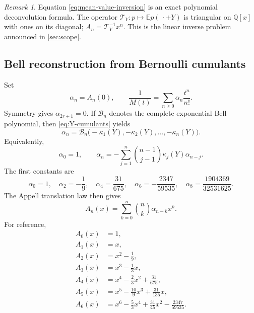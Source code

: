 \documentclass[11pt,oneside]{article}
\theoremstyle{frontier}
\theoremstyle{definition}
\theoremstyle{remark}
\newtheorem{remark}[theorem]{Remark}
\newcommand{\Q}{\mathbb Q}
\newcommand{\Bell}{\mathcal B}
\begin{document}
\begin{remark}
Equation \eqref{eq:mean-value-inversion} is an exact polynomial deconvolution formula.  The operator
$\mathcal T_Y:p\mapsto\mathbb E p(\,\cdot+Y)$ is triangular on $\Q[x]$ with ones on its diagonal;
$A_n=\mathcal T_Y^{-1}x^n$.  This is the linear inverse problem announced in
\cref{sec:scope}.
\end{remark}

\subsection{Bell reconstruction from Bernoulli cumulants}

Set
\begin{equation}
 \alpha_n=A_n(0),
 \qquad
 \frac1{M(t)}=\sum_{n\ge0}\alpha_n\frac{t^n}{n!}.
 \label{eq:alpha-def}
\end{equation}
Symmetry gives $\alpha_{2r+1}=0$.  If $\Bell_n$ denotes the complete exponential Bell polynomial,
then \eqref{eq:Y-cumulants} yields
\begin{equation}
 \boxed{
 \alpha_n=\Bell_n\bigl(-\kappa_1(Y),-\kappa_2(Y),\ldots,-\kappa_n(Y)\bigr).
 }
 \label{eq:alpha-Bell}
\end{equation}
Equivalently,
\begin{equation}
 \alpha_0=1,
 \qquad
 \alpha_n=-\sum_{j=1}^n\binom{n-1}{j-1}\kappa_j(Y)\alpha_{n-j}.
 \label{eq:alpha-recurrence}
\end{equation}
The first constants are
\begin{equation}
 \alpha_0=1,
 \quad \alpha_2=-\frac19,
 \quad \alpha_4=\frac{31}{675},
 \quad \alpha_6=-\frac{2347}{59535},
 \quad \alpha_8=\frac{1904369}{32531625}.
 \label{eq:alpha-first}
\end{equation}
The Appell translation law then gives
\begin{equation}
 A_n(x)=\sum_{k=0}^n\binom nk\alpha_{n-k}x^k.
 \label{eq:A-from-alpha}
\end{equation}
For reference,
\begin{equation}
\begin{aligned}
 A_0(x)&=1,\\
 A_1(x)&=x,\\
 A_2(x)&=x^2-\frac19,\\
 A_3(x)&=x^3-\frac13x,\\
 A_4(x)&=x^4-\frac23x^2+\frac{31}{675},\\
 A_5(x)&=x^5-\frac{10}{9}x^3+\frac{31}{135}x,\\
 A_6(x)&=x^6-\frac53x^4+\frac{31}{45}x^2-\frac{2347}{59535}.
\end{aligned}
\label{eq:A-first-polys}
\end{equation}
\end{document}
